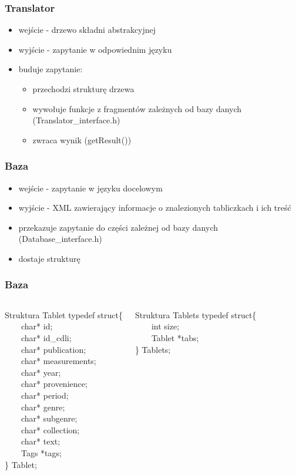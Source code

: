 \documentclass[xcolor=dvipsnames,10pt]{beamer}
\begin{document}
\begin{frame}
\frametitle{Translator}
\begin{itemize}
\item wejście - drzewo składni abstrakcyjnej
\item wyjście - zapytanie w odpowiednim języku
\item buduje zapytanie:
\begin{itemize}
 \item przechodzi strukturę drzewa
 \item wywołuje funkcje z fragmentów zależnych od bazy danych (Translator\_interface.h)
 \item zwraca wynik (getResult())
\end{itemize}
\end{itemize}
\end{frame}


\begin{frame}
     \frametitle{Baza}
\begin{itemize}
\item wejście - zapytanie w języku docelowym
\item wyjście - XML zawierający informacje o znalezionych tabliczkach i ich treść
\item przekazuje zapytanie do części zależnej od bazy danych (Database\_interface.h)
\item dostaje strukturę
\end{itemize}
\end{frame}

\begin{frame}
 \frametitle{Baza}
\begin{columns}[t]
\begin{block}{Struktura Tablet}
typedef struct\{ \\
~~~~char* id; \\
~~~~char* id\_cdli; \\
~~~~char* publication; \\
~~~~char* measurements; \\
~~~~char* year; \\
~~~~char* provenience; \\
~~~~char* period; \\
~~~~char* genre; \\
~~~~char* subgenre; \\
~~~~char* collection; \\
~~~~char* text; \\
~~~~Tags *tags; \\
\} Tablet; \\
\end{block}
\begin{block}{Struktura Tablets}
typedef struct\{ \\
~~~~int size; \\
~~~~Tablet *tabs; \\
\} Tablets;
\end{block}
\end{columns}

\end{frame}
\end{document}

